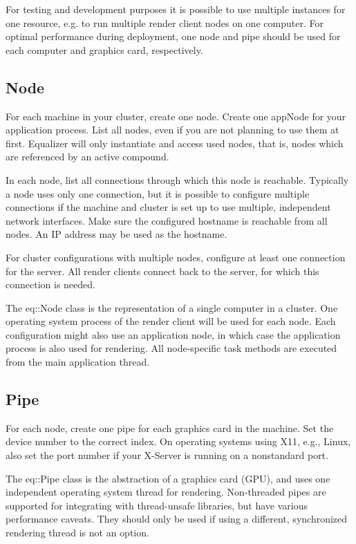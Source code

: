 \documentclass[10pt,a4]{scrartcl}
\begin{document}
For testing and development purposes it is possible to use multiple
instances for one resource, e.g. to run multiple render client nodes on
one computer. For optimal performance during deployment, one node and
pipe should be used for each computer and graphics card, respectively.

\subsection{Node}

For each machine in your cluster, create one \textsf{node}. Create one
\textsf{appNode} for your application process. List all nodes, even if you are
not planning to use them at first. Equalizer will only instantiate and access
used nodes, that is, nodes which are referenced by an active compound.

In each node, list all \textsf{connection}s through which this node is
reachable. Typically a node uses only one connection, but it is possible
to configure multiple connections if the machine and cluster is set up
to use multiple, independent network interfaces. Make sure the
configured \textsf{hostname} is reachable from all nodes. An IP address
may be used as the hostname.

For cluster configurations with multiple nodes, configure at least one
connection for the server. All render clients connect back to the server, for
which this connection is needed.

The \textsf{eq::Node} class is the representation of a single computer
in a cluster. One operating system process of the render client will be
used for each node. Each configuration might also use an application
node, in which case the application process is also used for
rendering. All node-specific task methods are executed from the main
application thread.

\subsection{Pipe}

For each node, create one \textsf{pipe} for each graphics card in the
machine. Set the \textsf{device} number to the correct index. On
operating systems using X11, e.g., Linux, also set the port number if
your X-Server is running on a nonstandard port.

The \textsf{eq::Pipe} class is the abstraction of a graphics card (GPU), and
uses one independent operating system thread for rendering. Non-threaded pipes
are supported for integrating with thread-unsafe libraries, but have various
performance caveats. They should only be used if using a different, synchronized
rendering thread is not an option.
\end{document}
